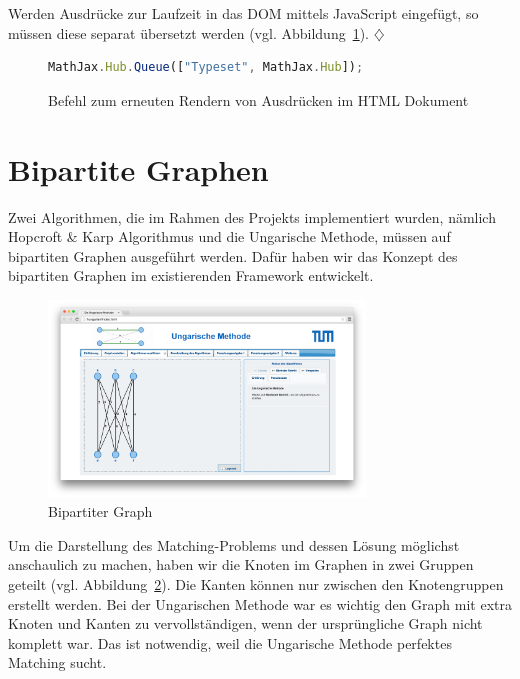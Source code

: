 Werden Ausdrücke zur Laufzeit in das DOM mittels JavaScript eingefügt, so müssen diese separat übersetzt werden (vgl. Abbildung~\ref{fig:listing-mathjax-render}). \hfill$\diamondsuit$

\begin{figure}[h!]
\begin{lstlisting}[language=JavaScript]
MathJax.Hub.Queue(["Typeset", MathJax.Hub]);
\end{lstlisting}
\caption[MathJAX: Render Befehl]{Befehl zum erneuten Rendern von Ausdrücken im HTML Dokument}\label{fig:listing-mathjax-render}
\end{figure}

\section{Bipartite Graphen} %
Zwei Algorithmen, die im Rahmen des Projekts implementiert wurden, nämlich Hopcroft \& Karp Algorithmus und die Ungarische Methode, müssen auf bipartiten Graphen ausgeführt werden. Dafür haben wir das Konzept des bipartiten Graphen im existierenden Framework entwickelt. 

\begin{figure}[h!]
	\centering
	\includegraphics[width=0.75\textwidth]{figures/hungarian-bipartite}
	\caption[Bipartiter Graph]{Bipartiter Graph}\label{fig:hungarian-bipartite}
\end{figure}

Um die Darstellung des Matching-Problems und dessen Lösung möglichst anschaulich zu machen, haben wir die Knoten im Graphen in zwei Gruppen geteilt (vgl. Abbildung~\ref{fig:hungarian-bipartite}). Die Kanten können nur zwischen den Knotengruppen erstellt werden. Bei der Ungarischen Methode war es wichtig den Graph mit extra Knoten und Kanten zu vervollständigen, wenn der ursprüngliche Graph nicht komplett war. Das ist notwendig, weil die Ungarische Methode perfektes Matching sucht.

